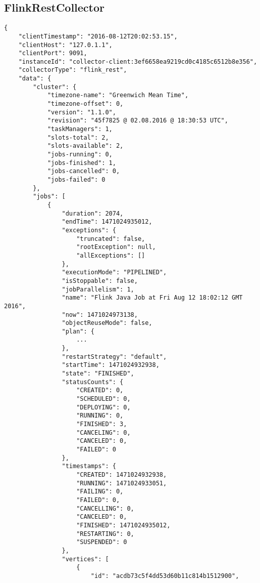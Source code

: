 \subsection{FlinkRestCollector}
\begin{lstlisting}[caption={"FlinkRestCollector" JSON result, abbreviated}, captionpos=b, label={lst:json-flink-rest}]
{
    "clientTimestamp": "2016-08-12T20:02:53.15",
    "clientHost": "127.0.1.1",
    "clientPort": 9091,
    "instanceId": "collector-client:3ef6658ea9219cd0c4185c6512b8e356",
    "collectorType": "flink_rest",
    "data": {
        "cluster": {
            "timezone-name": "Greenwich Mean Time",
            "timezone-offset": 0,
            "version": "1.1.0",
            "revision": "45f7825 @ 02.08.2016 @ 18:30:53 UTC",
            "taskManagers": 1,
            "slots-total": 2,
            "slots-available": 2,
            "jobs-running": 0,
            "jobs-finished": 1,
            "jobs-cancelled": 0,
            "jobs-failed": 0
        },
        "jobs": [
            {
                "duration": 2074,
                "endTime": 1471024935012,
                "exceptions": {
                    "truncated": false,
                    "rootException": null,
                    "allExceptions": []
                },
                "executionMode": "PIPELINED",
                "isStoppable": false,
                "jobParallelism": 1,
                "name": "Flink Java Job at Fri Aug 12 18:02:12 GMT 2016",
                "now": 1471024973138,
                "objectReuseMode": false,
                "plan": {
                    ...
                },
                "restartStrategy": "default",
                "startTime": 1471024932938,
                "state": "FINISHED",
                "statusCounts": {
                    "CREATED": 0,
                    "SCHEDULED": 0,
                    "DEPLOYING": 0,
                    "RUNNING": 0,
                    "FINISHED": 3,
                    "CANCELING": 0,
                    "CANCELED": 0,
                    "FAILED": 0
                },
                "timestamps": {
                    "CREATED": 1471024932938,
                    "RUNNING": 1471024933051,
                    "FAILING": 0,
                    "FAILED": 0,
                    "CANCELLING": 0,
                    "CANCELED": 0,
                    "FINISHED": 1471024935012,
                    "RESTARTING": 0,
                    "SUSPENDED": 0
                },
                "vertices": [
                    {
                        "id": "acdb73c5f4dd53d60b11c814b1512900",

\end{lstlisting}

